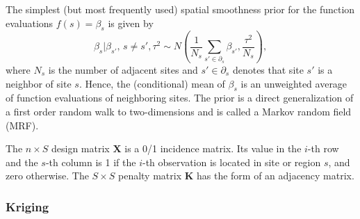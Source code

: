 \documentclass[11pt,a4paper,twoside]{bayesxarticle}
\def \Kvec {\vec{K}}
\def \Kvec {\mathbf{K}}
\def \Xvec {\mathbf{X}}
\begin{document}
The simplest (but most frequently used) spatial smoothness prior for
the function evaluations $f(s)=\beta_{s}$ is given by
\begin{equation}
\label{adjacency} \beta_{s} | \beta_{s'}, \, {s \neq
s'},\tau^2 \sim N \left( \frac{1}{N_s} \sum_{s' \in \partial_s}
\beta_{s'} , \frac{\tau^2}{N_s} \right),
\end{equation}
where $N_s$ is the number of adjacent sites and $s' \in
\partial_s$ denotes that site $s'$ is a neighbor of site $s$. Hence,
the (conditional) mean of $\beta_{s}$ is an unweighted average of
function evaluations of neighboring sites. The prior is a direct
generalization of a first order random walk to two-dimensions and is
called a Markov random field (MRF).


The $n \times S$ design matrix $\Xvec$ is a 0/1 incidence matrix. Its
value in the $i$-th row and the $s$-th column is 1 if the $i$-th
observation is located in site or region $s$, and zero otherwise.
The $S \times S$ penalty matrix $\Kvec$ has the form of an adjacency
matrix.

\subsubsection{Kriging}
\end{document}
